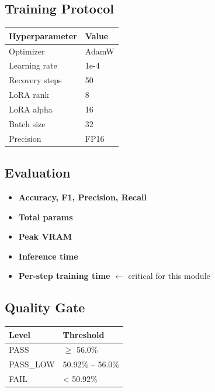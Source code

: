 \subsection{Training Protocol}

\begin{table}[H]
\centering
\small
\begin{tabular}{ll}
\toprule
\textbf{Hyperparameter} & \textbf{Value} \\
\midrule
Optimizer & AdamW \\
Learning rate & 1e-4 \\
Recovery steps & 50 \\
LoRA rank & 8 \\
LoRA alpha & 16 \\
Batch size & 32 \\
Precision & FP16 \\
\bottomrule
\end{tabular}
\end{table}

\subsection{Evaluation}

\begin{itemize}
\item \textbf{Accuracy, F1, Precision, Recall}
\item \textbf{Total params}
\item \textbf{Peak VRAM}
\item \textbf{Inference time}
\item \textbf{Per-step training time} $\leftarrow$ critical for this module

\end{itemize}
\subsection{Quality Gate}

\begin{table}[H]
\centering
\small
\begin{tabular}{ll}
\toprule
\textbf{Level} & \textbf{Threshold} \\
\midrule
PASS & $\ge$ 56.0\% \\
PASS\_LOW & 50.92\% -- 56.0\% \\
FAIL & \textless{} 50.92\% \\
\bottomrule
\end{tabular}
\end{table}

